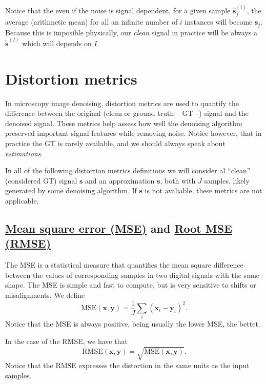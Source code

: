 \documentclass{article}
\begin{document}
Notice that the even if the noise is signal dependent, for a given
sample $\hat{\mathbf{s}}^{(i)}_j$, the average (arithmetic mean) for
all an infinite number of $i$ instances will become
$\mathbf{s}_j$. Because this is imposible physically, our \emph{clean}
signal in practice will be always a $\tilde{\mathbf{s}}^{(I)}$ which
will depends on $I$.


\section{Distortion metrics}

In microscopy image denoising, distortion metrics are used to quantify
the difference between the original (clean or ground truth -- GT --)
signal and the denoised signal. These metrics help assess how well the
denoising algorithm preserved important signal features while removing
noise. Notice however, that in practice the GT is rarely available, and
we should always speak about \emph{estimations}.

In all of the following distortion metrics definitions we will
consider al ``clean'' (considered GT) signal $\mathbf{s}$ and an
approximation $\mathbf{s}$, both with $J$ samples, likely
generated by some denoising algorithm. If $\mathbf{s}$ is not
avaliable, these metrics are not applicable.

\subsection{\href{https://en.wikipedia.org/wiki/Mean_squared_error}{Mean square error (MSE)} and \href{https://en.wikipedia.org/wiki/Root_mean_square_deviation}{Root MSE (RMSE)}}

The MSE is a statistical measure that quantifies the mean square
difference between the values of corresponding samples in two digital
signals with the same shape. The MSE is simple and fast to compute,
but is very sensitive to shifts or misalignments. We define
\begin{equation}
  \text{MSE}(\mathbf{x},\mathbf{y}) = \frac{1}{J}\sum_i(\mathbf{x}_i - \mathbf{y}_i)^2.
  \label{eq:MSE}
\end{equation}
Notice that the MSE is always positive, being usually the lower MSE, the bettet.

In the case of the RMSE, we have that
\begin{equation}
  \text{RMSE}(\mathbf{x},\mathbf{y}) = \sqrt{\text{MSE}(\mathbf{x},\mathbf{y})}.
  \label{eq:RMSE}
\end{equation}
Notice that the RMSE expresses the distortion in the same units as the
input samples.
\end{document}
